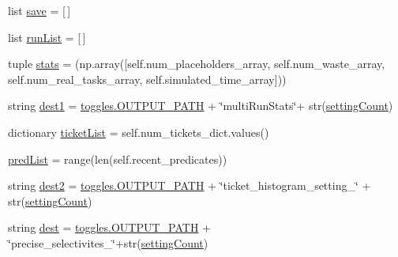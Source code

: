 \begin{DoxyCompactItemize}
list \hyperlink{classdynamicfilterapp_1_1test__simulations_1_1_simulation_test_aa53b18c2bb4cfef68354cc568fae8e98}{save} = \mbox{[}$\,$\mbox{]}
\item 
list \hyperlink{classdynamicfilterapp_1_1test__simulations_1_1_simulation_test_af0a015ca9f30cd7a3f0fdade090df146}{run\+List} = \mbox{[}$\,$\mbox{]}
\item 
tuple \hyperlink{classdynamicfilterapp_1_1test__simulations_1_1_simulation_test_a7735d195f566a3c7a06a23cecd0d22df}{stats} = (np.\+array(\mbox{[}self.\+num\+\_\+placeholders\+\_\+array, self.\+num\+\_\+waste\+\_\+array, self.\+num\+\_\+real\+\_\+tasks\+\_\+array, self.\+simulated\+\_\+time\+\_\+array\mbox{]}))
\item 
string \hyperlink{classdynamicfilterapp_1_1test__simulations_1_1_simulation_test_a378bd708ce64c9205a9d5b7ef5179008}{dest1} = \hyperlink{namespacedynamicfilterapp_1_1toggles_a04644ded1d5e3fc8bd58a411209b7886}{toggles.\+O\+U\+T\+P\+U\+T\+\_\+\+P\+A\+TH} + \char`\"{}multi\+Run\+Stats\char`\"{}+ str(\hyperlink{classdynamicfilterapp_1_1test__simulations_1_1_simulation_test_a18e9dc3d267483ccc2dbacf54439c5ff}{setting\+Count})
\item 
dictionary \hyperlink{classdynamicfilterapp_1_1test__simulations_1_1_simulation_test_a730cc0ea27c2fcb7b9cacd041f88e6fc}{ticket\+List} = self.\+num\+\_\+tickets\+\_\+dict.\+values()
\item 
\hyperlink{classdynamicfilterapp_1_1test__simulations_1_1_simulation_test_a8c4afebfe163bfabdc976314d726eca9}{pred\+List} = range(len(self.\+recent\+\_\+predicates))
\item 
string \hyperlink{classdynamicfilterapp_1_1test__simulations_1_1_simulation_test_a55df54097e78f89cfbea1eac42c38c6c}{dest2} = \hyperlink{namespacedynamicfilterapp_1_1toggles_a04644ded1d5e3fc8bd58a411209b7886}{toggles.\+O\+U\+T\+P\+U\+T\+\_\+\+P\+A\+TH} + \char`\"{}ticket\+\_\+histogram\+\_\+setting\+\_\+\char`\"{} + str(\hyperlink{classdynamicfilterapp_1_1test__simulations_1_1_simulation_test_a18e9dc3d267483ccc2dbacf54439c5ff}{setting\+Count})
\item 
string \hyperlink{classdynamicfilterapp_1_1test__simulations_1_1_simulation_test_a66d4da94e0e4f717ff3e7f23c53f7c2d}{dest} = \hyperlink{namespacedynamicfilterapp_1_1toggles_a04644ded1d5e3fc8bd58a411209b7886}{toggles.\+O\+U\+T\+P\+U\+T\+\_\+\+P\+A\+TH} + \char`\"{}precise\+\_\+selectivites\+\_\+\char`\"{}+str(\hyperlink{classdynamicfilterapp_1_1test__simulations_1_1_simulation_test_a18e9dc3d267483ccc2dbacf54439c5ff}{setting\+Count})
\item 

\end{DoxyCompactItemize}
